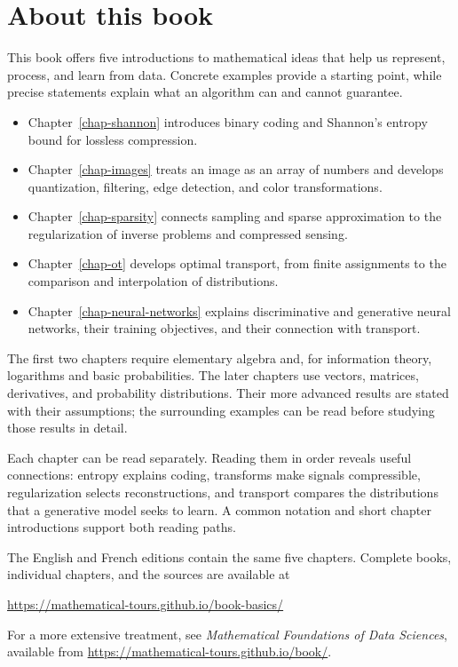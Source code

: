 \chapter*{About this book}
This book offers five introductions to mathematical ideas that help us represent, process, and learn from data. Concrete examples provide a starting point, while precise statements explain what an algorithm can and cannot guarantee.
\begin{itemize}
\item Chapter~\ref{chap-shannon} introduces binary coding and Shannon's entropy bound for lossless compression.
\item Chapter~\ref{chap-images} treats an image as an array of numbers and develops quantization, filtering, edge detection, and color transformations.
\item Chapter~\ref{chap-sparsity} connects sampling and sparse approximation to the regularization of inverse problems and compressed sensing.
\item Chapter~\ref{chap-ot} develops optimal transport, from finite assignments to the comparison and interpolation of distributions.
\item Chapter~\ref{chap-neural-networks} explains discriminative and generative neural networks, their training objectives, and their connection with transport.
\end{itemize}
The first two chapters require elementary algebra and, for information theory, logarithms and basic probabilities. The later chapters use vectors, matrices, derivatives, and probability distributions. Their more advanced results are stated with their assumptions; the surrounding examples can be read before studying those results in detail.

Each chapter can be read separately. Reading them in order reveals useful connections: entropy explains coding, transforms make signals compressible, regularization selects reconstructions, and transport compares the distributions that a generative model seeks to learn. A common notation and short chapter introductions support both reading paths.

The English and French editions contain the same five chapters. Complete books, individual chapters, and the sources are available at
\begin{center}\url{https://mathematical-tours.github.io/book-basics/}\end{center}
For a more extensive treatment, see \emph{Mathematical Foundations of Data Sciences}, available from \url{https://mathematical-tours.github.io/book/}.

